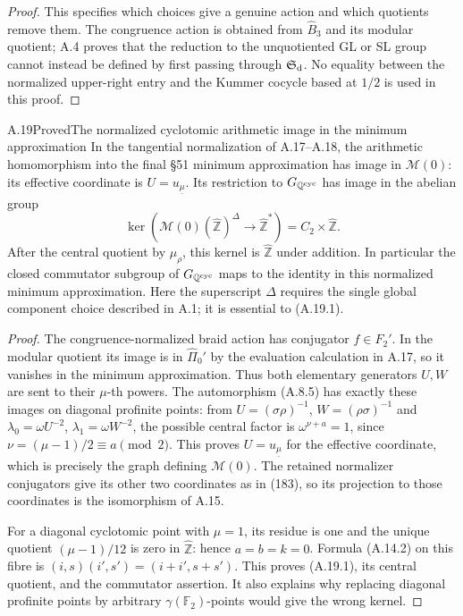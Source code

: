 \begin{proof}
This specifies which choices give a genuine action and which
quotients remove them. The congruence action is obtained from
$\widehat B_3$ and its modular quotient; A.4 proves that the
reduction to the unquotiented GL or SL group cannot instead be
defined by first passing through $\mathfrak S_{\rm d}$.
No equality between the normalized upper-right entry and the
Kummer cocycle based at $1/2$ is used in this proof.
\end{proof}

\begin{statement}{A.19}{Proved}{The normalized cyclotomic arithmetic image in the minimum approximation}
In the tangential normalization of A.17--A.18, the arithmetic
homomorphism into the final \S51 minimum approximation has image in
$\mathcal M(0)$: its effective coordinate is $U=u_{\underline\mu}$.
Its restriction to $G_{\mathbb Q^{\rm cyc}}$ has image in the abelian
group
\[
 \ker(\mathcal M(0)(\widehat{\mathbb Z})^{\Delta}
                   \longrightarrow\widehat{\mathbb Z}^{*})
       =C_2\times\widehat{\mathbb Z}.              \tag{A.19.1}
\]
After the central quotient by $\mu_\rho$, this kernel is
$\widehat{\mathbb Z}$ under addition. In particular the closed
commutator subgroup of $G_{\mathbb Q^{\rm cyc}}$ maps to the identity
in this normalized minimum approximation. Here the superscript
$\Delta$ requires the single global component choice described in
A.1; it is essential to (A.19.1).
\end{statement}
\begin{proof}
The congruence-normalized braid action has conjugator
$f\in\widehat F_2'$. In the modular quotient its image is in
$\widehat\Pi_0'$ by the evaluation calculation in A.17, so it
vanishes in the minimum approximation. Thus both elementary
generators $U,W$ are sent to their $\mu$-th powers.
The automorphism (A.8.5) has exactly these images on diagonal
profinite points: from $U=(\sigma\rho)^{-1}$,
$W=(\rho\sigma)^{-1}$ and
$\lambda_0=\omega U^{-2}$, $\lambda_1=\omega W^{-2}$,
the possible central factor is $\omega^{\nu+a}=1$, since
$\nu=(\mu-1)/2\equiv a\pmod2$.
This proves $U=u_{\underline\mu}$ for the effective coordinate,
which is precisely the graph defining $\mathcal M(0)$.
The retained normalizer conjugators give its other two coordinates
as in (183), so its projection to those coordinates is the
isomorphism of A.15.

For a diagonal cyclotomic point with $\mu=1$, its residue is one
and the unique quotient $(\mu-1)/12$ is zero in
$\widehat{\mathbb Z}$: hence $a=b=k=0$. Formula (A.14.2) on this
fibre is $(i,s)(i',s')=(i+i',s+s')$. This proves (A.19.1), its
central quotient, and the commutator assertion. It also explains
why replacing diagonal profinite points by arbitrary
$\gamma(\mathbb F_2)$-points would give the wrong kernel.
\end{proof}
